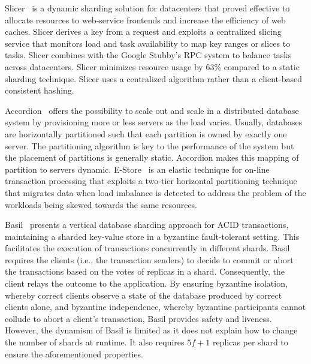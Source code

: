 \documentclass[11pt,dvipdfm]{article}
\newcommand{\vincent}[1]{\emph{Vincent: #1}}%
\newcommand{\deepal}[1]{\emph{Deepal: #1}}%
\begin{document}
Slicer~\cite{AMH16} is a dynamic sharding solution for datacenters that proved effective to allocate resources to web-service frontends and increase the efficiency of web caches.  Slicer derives a key from a request and exploits a centralized slicing service that monitors load and task availability to map key ranges or slices to tasks. Slicer combines with the Google Stubby's RPC system to balance tasks across datacenters.
Slicer minimizes resource usage by 63\% compared to a static sharding technique. 
Slicer uses a centralized algorithm rather than a client-based consistent hashing.

Accordion~\cite{SMA14} offers the possibility to scale out and scale in a distributed database system by provisioning more or less servers as the load varies. Usually, databases are horizontally partitioned such that each partition is owned by exactly one server. 
%
The partitioning algorithm is key to the performance of the system but the placement of partitions is generally static. Accordion makes this mapping of partition to servers dynamic. E-Store~\cite{TMS14} is an elastic technique for on-line transaction processing that exploits a two-tier horizontal partitioning technique that migrates data when load imbalance is detected to address the problem of the workloads being skewed towards the same resources.


Basil~\cite{10.1145/3477132.3483552} presents a vertical database sharding approach for ACID transactions, maintaining a sharded key-value store in a byzantine fault-tolerant setting. This facilitates the execution of transactions concurrently in different shards. Basil requires the clients (i.e., the transaction senders) to decide to commit or abort the transactions based on the votes of replicas in a shard. Consequently, the client relays the outcome to the application. By ensuring byzantine isolation, whereby correct clients observe a state of the database produced by correct clients alone, and byzantine independence, whereby byzantine participants cannot collude to abort a client's transaction, Basil provides safety and liveness. However, the dynamism of Basil is limited as it does not 
explain how to change the number of shards at runtime. It also requires $5f+1$ replicas per shard to ensure the aforementioned properties.
\end{document}
